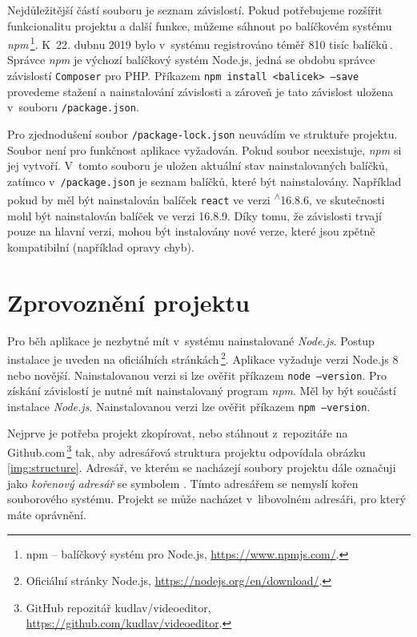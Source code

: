 Nejdůležitější částí souboru je seznam závislostí. Pokud potřebujeme rozšířit funkcionalitu projektu a další funkce, můžeme sáhnout po balíčkovém systému \textit{npm}\,\footnote{npm -- balíčkový systém pro Node.js, \url{https://www.npmjs.com/}.}. K~22. dubnu 2019 bylo v~systému registrováno téměř 810 tisíc balíčků\,\cite{modulecounts}. Správce \textit{npm} je výchozí balíčkový systém Node.js, jedná se obdobu správce závislostí \texttt{Composer} pro PHP. Příkazem \texttt{npm install <balicek> --save} provedeme stažení a nainstalování závislosti a zároveň je tato závislost uložena v~souboru \texttt{/package.json}.

Pro zjednodušení soubor \texttt{/package-lock.json} neuvádím ve struktuře projektu. Soubor není pro funkčnost aplikace vyžadován. Pokud soubor neexistuje, \textit{npm} si jej vytvoří. V~tomto souboru je uložen aktuální stav nainstalovaných balíčků, zatímco v~\texttt{/package.json} je seznam balíčků, které  být nainstalovány. Například pokud by měl být nainstalován balíček \texttt{react} ve verzi \textsuperscript{$\wedge$}16.8.6, ve skutečnosti mohl být nainstalován balíček ve verzi 16.8.9. Díky tomu, že závislosti trvají pouze na hlavní verzi, mohou být instalovány nové verze, které jsou zpětně kompatibilní (například opravy chyb).

\section{Zprovoznění projektu}
Pro běh aplikace je nezbytné mít v~systému nainstalované \textit{Node.js}. Postup instalace je uveden na oficiálních stránkách\,\footnote{Oficiální stránky Node.js, \url{https://nodejs.org/en/download/}.}. Aplikace vyžaduje verzi Node.js 8 nebo novější. Nainstalovanou verzi si lze ověřit příkazem \texttt{node --version}. Pro získání závislostí je nutné mít nainstalovaný program \textit{npm}. Měl by být součástí instalace \textit{Node.js}. Nainstalovanou verzi lze ověřit příkazem \texttt{npm --version}.

Nejprve je potřeba projekt zkopírovat, nebo stáhnout z~repozitáře na Github.com\,\footnote{GitHub repozitář kudlav/videoeditor, \url{https://github.com/kudlav/videoeditor}.} tak, aby adresářová struktura projektu odpovídala obrázku \ref{img:structure}. Adresář, ve kterém se nacházejí soubory projektu dále označuji jako \textit{kořenový adresář} se symbolem \uv{/}. Tímto adresářem se nemyslí kořen souborového systému. Projekt se může nacházet v~libovolném adresáři, pro který máte oprávnění.

